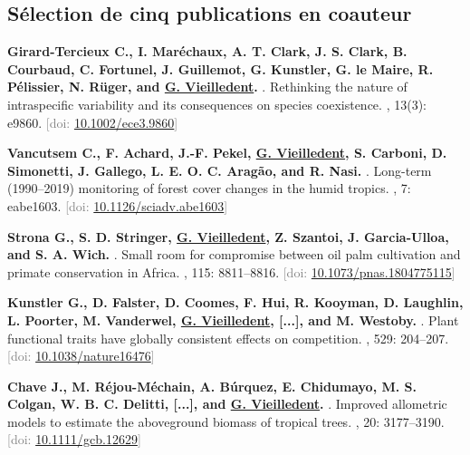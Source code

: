 \documentclass[10pt,a4paper,sans]{moderncv}
\newcounter{enumiv_gv}
\newcommand\doi[1]{[doi: \href{https://doi.org/#1}{#1}]}
\begin{document}
\vspace{0.3cm}
\subsection{Sélection de cinq publications en coauteur}

\begin{thebibliography}{5}

\setcounter{enumiv}{4}
\textbf{Girard-Tercieux C., I. Maréchaux, A. T. Clark, J. S. Clark, B. Courbaud, C. Fortunel, J. Guillemot, G. Kunstler, G. le Maire, R. Pélissier, N. Rüger, and \underline{G. Vieilledent}.}
.
\newblock Rethinking the nature of intraspecific variability and its consequences on species coexistence.
, 13(3): e9860.
\newblock \textcolor{gray}{\doi{10.1002/ece3.9860}}
  
\setcounter{enumiv}{3}
\textbf{Vancutsem C., F. Achard, J.-F. Pekel, \underline{G. Vieilledent}, S. Carboni, D. Simonetti, J. Gallego, L. E. O. C. Aragão, and R. Nasi.}
.
\newblock Long-term (1990--2019) monitoring of forest cover changes in the humid tropics.
, 7: eabe1603.
\newblock \textcolor{gray}{\doi{10.1126/sciadv.abe1603}}

\setcounter{enumiv}{2}
\textbf{Strona G., S. D. Stringer, \underline{G. Vieilledent}, Z. Szantoi, J. Garcia-Ulloa, and S. A. Wich.}
.
\newblock Small room for compromise between oil palm cultivation and primate conservation in Africa.
, 115: 8811--8816.
\newblock \textcolor{gray}{\doi{10.1073/pnas.1804775115}}

\setcounter{enumiv}{1}
\textbf{Kunstler G., D. Falster, D. Coomes, F. Hui, R. Kooyman, D. Laughlin, L. Poorter, M. Vanderwel, \underline{G. Vieilledent}, [...], and M. Westoby.} 
.
\newblock Plant functional traits have globally consistent effects on competition.
, 529: 204--207.
\newblock \textcolor{gray}{\doi{10.1038/nature16476}}

\setcounter{enumiv}{0}
\textbf{Chave J., M. Réjou-Méchain, A. Búrquez, E. Chidumayo, M. S. Colgan, W. B. C. Delitti, [...], and \underline{G. Vieilledent}.} 
.
\newblock Improved allometric models to estimate the aboveground biomass of tropical trees. 
, 20: 3177--3190.
\newblock \textcolor{gray}{\doi{10.1111/gcb.12629}}

\end{thebibliography}
\end{document}
